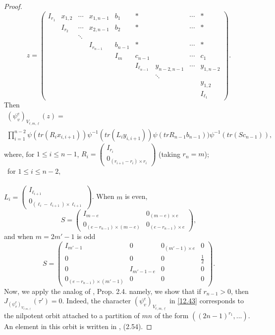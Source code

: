 \documentclass[12pts]{amsart}
\begin{document}
\begin{proof}
\begin{equation}\label{12.42}
z=\begin{pmatrix}I_{r_1}&x_{1,2}&\cdots&x_{1,n-1}&b_1&\ast
&&\cdots&\ast\\&I_{r_2}&\cdots&x_{2,n-1}&b_2&\ast&&\cdots&\ast\\&&\ddots\\&&&I_{r_{n-1}}&b_{n-1}&\ast&&\cdots&\ast\\
&&&&I_m&c_{n-1}&&\cdots&c_1\\&&&&&I_{\ell_{n-1}}&y_{n-2,n-1}&\cdots&y_{1,n-2}\\&&&&&&\ddots\\&&&&&&&&y_{1,2}\\
&&&&&&&&I_{\ell_1}\end{pmatrix}.
\end{equation}
Then
\begin{multline}\label{12.43}
(\psi^e_v)_{V_{\bar{r},m,\underline{\ell}}}(z)=\\
\prod_{i=1}^{n-2}\psi(tr(R_ix_{i,i+1}))\psi^{-1}(tr(L_iy_{i,i+1}))\psi(trR_{n-1}b_{n-1}))\psi^{-1}(tr(Sc_{n-1})),
\end{multline}
where, for $1\leq i\leq n-1$, $R_i=\begin{pmatrix}I_{r_i}\\0_{(r_{i+1}-r_i)\times
		r_i}\end{pmatrix}$ (taking $r_n=m$);\\\ for $ 1\leq i\leq n-2$,\\
	\\
$L_i=\begin{pmatrix}I_{\ell_{i+1}}\\0_{(\ell_i-\ell_{i+1})\times
		\ell_{i+1}}\end{pmatrix}$. When $m$ is even,
	$$
	S=\begin{pmatrix}I_{m-e}&0_{(m-e)\times
		e}\\0_{(e-r_{n-1})\times (m-e)}&0_{(e-r_{n-1})\times
		e}\end{pmatrix},
	$$
	and when $m=2m'-1$ is odd
	$$
	S=\begin{pmatrix}I_{m'-1}&0&0_{(m'-1)\times e}&0\\0&0&0&\frac{1}{2}\\0&I_{m'-1-e}&0&0\\0_{(e-r_{n-1})\times (m'-1)}&0&0&0\end{pmatrix}.
	$$
Now, we apply the analog of \cite{GS18}, Prop. 2.4. namely, we show that if $r_{n-1}>0$, then $J_{(\psi^e_v)_{V_{\bar{r},m,\underline{\ell}}}}(\tau')=0$. Indeed, the character $(\psi^e_v)_{V_{\bar{r},m,\underline{\ell}}}$ in \eqref{12.43} corresponds to the nilpotent orbit attached to a partition of $mn$ of the form $((2n-1)^{r_1},...)$. An element in this orbit is written in \cite{GS18}, (2.54).

\end{proof}
\end{document}
